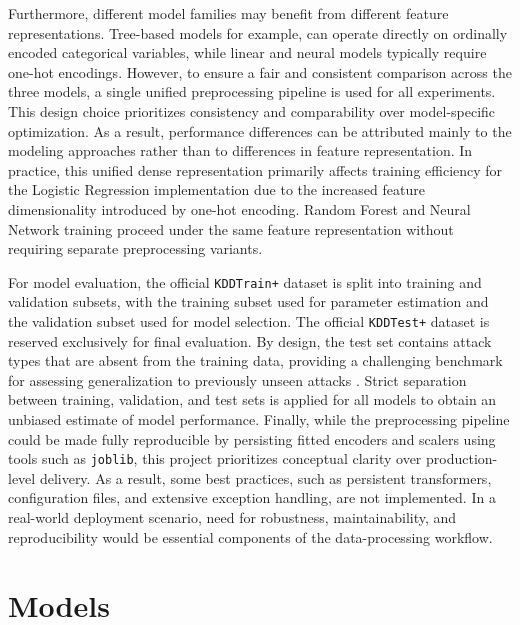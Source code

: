 Furthermore, different model families may benefit from different feature representations. Tree-based models for example, can operate directly on ordinally encoded categorical 
variables, while linear and neural models typically require one-hot encodings. However, to ensure a fair and consistent comparison across the three models, a single unified 
preprocessing pipeline is used for all experiments. This design choice prioritizes consistency and comparability over model-specific optimization. As a result, performance 
differences can be attributed mainly to the modeling approaches rather than to differences in feature representation. In practice, this unified dense representation primarily 
affects training efficiency for the Logistic Regression implementation due to the increased feature dimensionality introduced by one-hot encoding. Random Forest and Neural Network 
training proceed under the same feature representation without requiring separate preprocessing variants.

For model evaluation, the official \texttt{KDDTrain+} dataset is split into training and validation subsets, with the training subset used for parameter estimation and the 
validation subset used for model selection. The official \texttt{KDDTest+} dataset is reserved exclusively for final evaluation. By design, the test set contains attack types 
that are absent from the training data, providing a challenging benchmark for assessing generalization to previously unseen attacks \cite{tavallaee2009detailed}. 
Strict separation between training, validation, and test sets is applied for all models to obtain an unbiased estimate of model performance. Finally, while the preprocessing 
pipeline could be made fully reproducible by persisting fitted encoders and scalers using tools such as \texttt{joblib}, this project prioritizes conceptual clarity over 
production-level delivery. As a result, some best practices, such as persistent transformers, configuration files, and extensive exception handling, are not implemented. 
In a real-world deployment scenario, need for robustness, maintainability, and reproducibility would be essential components of the data-processing workflow.

\section{Models}
\label{sec:models}

